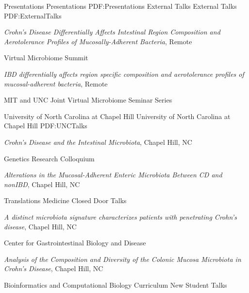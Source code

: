 \documentclass[letterpaper,MMMyyyy,nonstopmode]{simpleresumecv}
\begin{document}
\begin{Body}

\Section
{Presentations}
{Presentations}
{PDF:Presentations}
\BigGap
\SubSection
{External Talks}
{External Talks}
{PDF:ExternalTalks}

\BulletItem
\textit{Crohn’s Disease Differentially Affects Intestinal Region Composition and Aerotolerance
Profiles of Mucosally-Adherent Bacteria},
Remote
\hfill
{} 
\begin{Detail}
\Item
Virtual Microbiome Summit
\end{Detail}

\BulletItem
\textit{IBD differentially affects region specific composition and aerotolerance profiles of
mucosal-adherent bacteria},
Remote
\hfill
{} 
\begin{Detail}
\Item
MIT and UNC Joint Virtual Microbiome Seminar Series
\end{Detail}

\BigGap
\SubSection
{University of North Carolina at Chapel Hill}
{University of North Carolina at Chapel Hill}
{PDF:UNCTalks}

\BulletItem
\textit{Crohn’s Disease and the Intestinal Microbiota},\newline
Chapel Hill, NC
\hfill
{} 
\begin{Detail}
\Item
Genetics Research Colloquium
\end{Detail}

\BulletItem
\textit{Alterations in the Mucosal-Adherent Enteric Microbiota Between CD and nonIBD},\newline
Chapel Hill, NC
\hfill
{} 
\begin{Detail}
\Item
Translations Medicine Closed Door Talks
\end{Detail}

\BulletItem
\textit{A distinct microbiota signature characterizes patients with penetrating Crohn’s disease},\newline
Chapel Hill, NC
\hfill
{} 
\begin{Detail}
\Item
Center for Gastrointestinal Biology and Disease
\end{Detail}

\BulletItem
\textit{Analysis of the Composition and Diversity of the Colonic Mucosa Microbiota in Crohn’s
Disease},\newline
Chapel Hill, NC
\hfill
{} 
\begin{Detail}
\Item
Bioinformatics and Computational Biology Curriculum New Student Talks
\end{Detail}


\end{Body}
\end{document}
